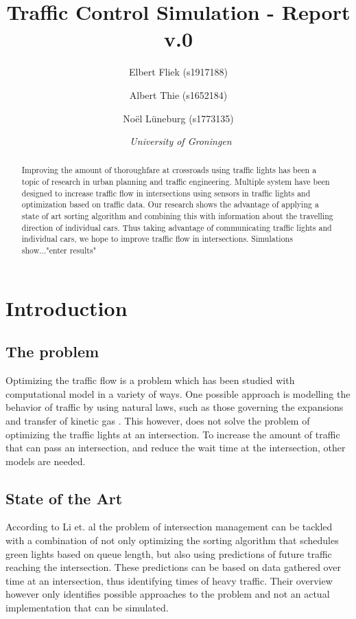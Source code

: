 \documentclass{article}
\begin{document}
\title{\textbf{\huge Traffic Control Simulation - Report v.0}}
\author{Elbert Fliek (s1917188) \affila \and
    Albert Thie (s1652184) \affila \and
    No\"el L\"uneburg (s1773135) \affila}
\date{\affila\ \textit{University of Groningen}}
\ttl
\pagestyle{empty}

\begin{abstract}
    Improving the amount of thoroughfare at crossroads using traffic lights has been a topic of research in urban planning and traffic engineering. Multiple system have been designed to increase traffic flow in intersections using sensors in traffic lights and optimization based on traffic data. Our research shows the advantage of applying a state of art sorting algorithm and combining this with information about the travelling direction of individual cars. Thus taking advantage of communicating traffic lights and individual cars, we hope to improve traffic flow in intersections. Simulations show..."enter results"  
\end{abstract}







\section{Introduction}
\subsection{The problem}
Optimizing the traffic flow is a problem which has been studied with computational model in a variety of ways. One possible approach is modelling the behavior of traffic by using natural laws, such as those governing the expansions and transfer of kinetic gas \cite{helbing2001master}. This however, does not solve the problem of optimizing the traffic lights at an intersection. To increase the amount of traffic that can pass an intersection, and reduce the wait time at the intersection, other models are needed.

\subsection{State of the Art}
According to Li et. al\cite{survey2014} the problem of intersection management can be tackled with a combination of not only optimizing the sorting algorithm that schedules green lights based on queue length, but also using predictions of future traffic reaching the intersection. These predictions can be based on data gathered over time at an intersection, thus identifying times of heavy traffic. Their overview however only identifies possible approaches to the problem and not an actual implementation that can be simulated.
\end{document}
